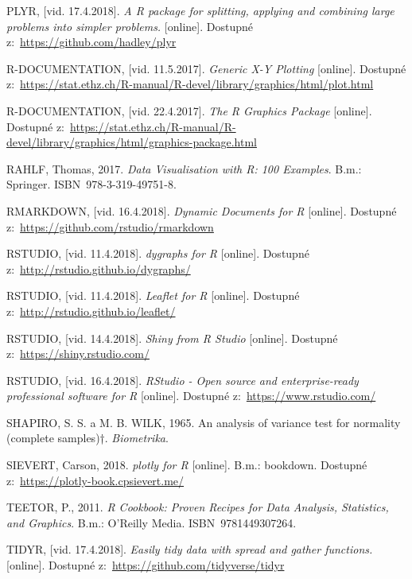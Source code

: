 \documentclass[12pt,]{article}
\begin{document}
\hypertarget{ref-plyr}{}
PLYR, {[}vid. 17.4.2018{]}. \emph{A R package for splitting, applying
and combining large problems into simpler problems.} {[}online{]}.
Dostupné z:~\url{https://github.com/hadley/plyr}

\hypertarget{ref-plot}{}
R-DOCUMENTATION, {[}vid. 11.5.2017{]}. \emph{Generic X-Y Plotting}
{[}online{]}. Dostupné
z:~\url{https://stat.ethz.ch/R-manual/R-devel/library/graphics/html/plot.html}

\hypertarget{ref-graphics}{}
R-DOCUMENTATION, {[}vid. 22.4.2017{]}. \emph{The R Graphics Package}
{[}online{]}. Dostupné
z:~\url{https://stat.ethz.ch/R-manual/R-devel/library/graphics/html/graphics-package.html}

\hypertarget{ref-datavis_rahlf}{}
RAHLF, Thomas, 2017. \emph{Data Visualisation with R: 100 Examples}.
B.m.: Springer. ISBN~978-3-319-49751-8.

\hypertarget{ref-rmarkdown}{}
RMARKDOWN, {[}vid. 16.4.2018{]}. \emph{Dynamic Documents for R}
{[}online{]}. Dostupné z:~\url{https://github.com/rstudio/rmarkdown}

\hypertarget{ref-dygraphs}{}
RSTUDIO, {[}vid. 11.4.2018{]}. \emph{dygraphs for R} {[}online{]}.
Dostupné z:~\url{http://rstudio.github.io/dygraphs/}

\hypertarget{ref-leaflet}{}
RSTUDIO, {[}vid. 11.4.2018{]}. \emph{Leaflet for R} {[}online{]}.
Dostupné z:~\url{http://rstudio.github.io/leaflet/}

\hypertarget{ref-shiny}{}
RSTUDIO, {[}vid. 14.4.2018{]}. \emph{Shiny from R Studio} {[}online{]}.
Dostupné z:~\url{https://shiny.rstudio.com/}

\hypertarget{ref-rstudio}{}
RSTUDIO, {[}vid. 16.4.2018{]}. \emph{RStudio - Open source and
enterprise-ready professional software for R} {[}online{]}. Dostupné
z:~\url{https://www.rstudio.com/}

\hypertarget{ref-SW_test}{}
SHAPIRO, S. S. a M. B. WILK, 1965. An analysis of variance test for
normality (complete samples)†. \emph{Biometrika}.

\hypertarget{ref-plotly}{}
SIEVERT, Carson, 2018. \emph{plotly for R} {[}online{]}. B.m.: bookdown.
Dostupné z:~\url{https://plotly-book.cpsievert.me/}

\hypertarget{ref-teetor2011}{}
TEETOR, P., 2011. \emph{R Cookbook: Proven Recipes for Data Analysis,
Statistics, and Graphics}. B.m.: O'Reilly Media. ISBN~9781449307264.

\hypertarget{ref-tidyr}{}
TIDYR, {[}vid. 17.4.2018{]}. \emph{Easily tidy data with spread and
gather functions.} {[}online{]}. Dostupné
z:~\url{https://github.com/tidyverse/tidyr}
\end{document}
